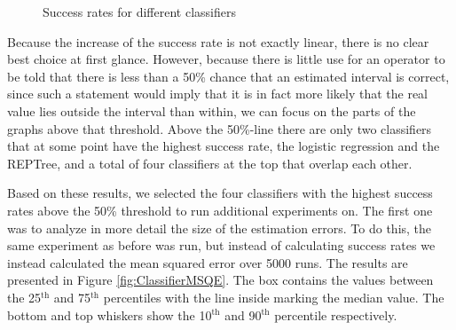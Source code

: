 \documentclass{sig-alternate}
\newcommand{\superscript}[1]{\ensuremath{^{\textrm{#1}}}}
\begin{document}
\begin{figure}[htb]
\begin{center}

	\caption{Success rates for different classifiers}
	\label{fig:ClassifierComparison}
\end{center}
\end{figure}

Because the increase of the success rate is not exactly linear, there is no clear best choice at first glance. However, because there is little use for an operator to be told that there is less than a 50\% chance that an estimated interval is correct, since such a statement would imply that it is in fact more likely that the real value lies outside the interval than within, we can focus on the parts of the graphs above that threshold. Above the 50\%-line there are only two classifiers that at some point have the highest success rate, the logistic regression and the REPTree, and a total of four classifiers at the top that overlap each other.

Based on these results, we selected the four classifiers with the highest success rates above the 50\% threshold to run additional experiments on. The first one was to analyze in more detail the size of the estimation errors. To do this, the same experiment as before was run, but instead of calculating success rates we instead calculated the mean squared error over 5000 runs. The results are presented in Figure \ref{fig:ClassifierMSQE}. The box contains the values between the 25\superscript{th} and 75\superscript{th} percentiles with the line inside marking the median value. The bottom and top whiskers show the 10\superscript{th} and 90\superscript{th} percentile respectively.
\end{document}
